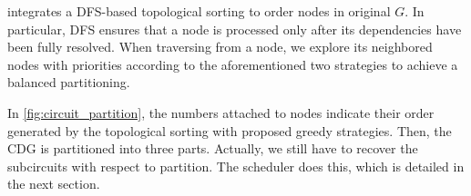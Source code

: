 \system integrates a DFS-based topological sorting to order nodes in original $G$. In particular, DFS ensures that a node is processed only after its dependencies have been fully resolved. 
When traversing from a node,  we explore its neighbored nodes with priorities according to the aforementioned two strategies to achieve a balanced partitioning.

In \cref{fig:circuit_partition}, the numbers attached to nodes indicate their order generated by the topological sorting with proposed greedy strategies. Then, the CDG is partitioned into three parts. Actually, we still have to recover the subcircuits with respect to partition. The scheduler does this, which is detailed in the next section.   

